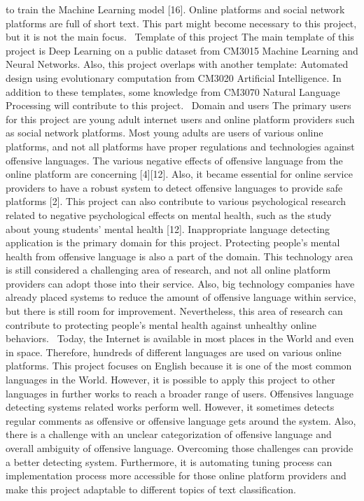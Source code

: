 \documentclass[12pt, natbib=false]{article}
\begin{document}
to train the Machine Learning model [16]. Online platforms and social network platforms are full of short text. This part might become necessary to this project, but it is not the main focus. 
Template of this project
The main template of this project is Deep Learning on a public dataset from CM3015 Machine Learning and Neural Networks. Also, this project overlaps with another template: Automated design using evolutionary computation from CM3020 Artificial Intelligence. In addition to these templates, some knowledge from CM3070 Natural Language Processing will contribute to this project. 
Domain and users
The primary users for this project are young adult internet users and online platform providers such as social network platforms. Most young adults are users of various online platforms, and not all platforms have proper regulations and technologies against offensive languages. The various negative effects of offensive language from the online platform are concerning [4][12]. Also, it became essential for online service providers to have a robust system to detect offensive languages to provide safe platforms [2]. This project can also contribute to various psychological research related to negative psychological effects on mental health, such as the study about young students’ mental health [12].
Inappropriate language detecting application is the primary domain for this project. Protecting people’s mental health from offensive language is also a part of the domain. This technology area is still considered a challenging area of research, and not all online platform providers can adopt those into their service. Also, big technology companies have already placed systems to reduce the amount of offensive language within service, but there is still room for improvement. Nevertheless, this area of research can contribute to protecting people’s mental health against unhealthy online behaviors. 
Today, the Internet is available in most places in the World and even in space. Therefore, hundreds of different languages are used on various online platforms. This project focuses on English because it is one of the most common languages in the World. However, it is possible to apply this project to other languages in further works to reach a broader range of users. Offensives language detecting systems related works perform well. However, it sometimes detects regular comments as offensive or offensive language gets around the system. Also, there is a challenge with an unclear categorization of offensive language and overall ambiguity of offensive language. Overcoming those challenges can provide a better detecting system. Furthermore, it is automating tuning process can implementation process more accessible for those online platform providers and make this project adaptable to different topics of text classification. 
\end{document}
